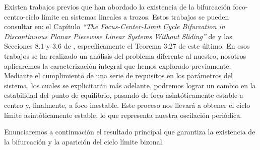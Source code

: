 \documentclass[12pt,a4paper]{report} %
\newcommand{\eref}[1]{\hyperref[#1]{\textcolor{blue}{(\ref*{#1})}}}
\begin{document}

	
	Existen trabajos previos que han abordado la existencia de la bifurcación foco-centro-ciclo límite en sistemas lineales a trozos. Estos trabajos se pueden consultar en: el Capítulo \textit{``The Focus-Center-Limit Cycle Bifurcation in Discontinuous Planar Piecewise Linear
	Systems Without Sliding''} de \cite{ciclolimite} y las Secciones 8.1 y 3.6 de \cite{amarillo}, específicamente el Teorema 3.27 de este último. En esos trabajos se ha realizado un análisis del problema diferente al nuestro, nosotros aplicaremos la caracterización integral que hemos explorado previamente. Mediante el cumplimiento de una serie de requisitos en los parámetros del sistema, los cuales se explicitarán más adelante, podremos lograr un cambio en la estabilidad del punto de equilibrio, pasando de foco asintóticamente estable a centro y, finalmente, a foco inestable. Este proceso nos llevará a obtener el ciclo límite asintóticamente estable, lo que representa nuestra oscilación periódica.
	
	\vspace{0.5cm} Enunciaremos a continuación el resultado principal que garantiza la existencia de la bifurcación y la aparición del ciclo límite bizonal.
	
\end{document}
